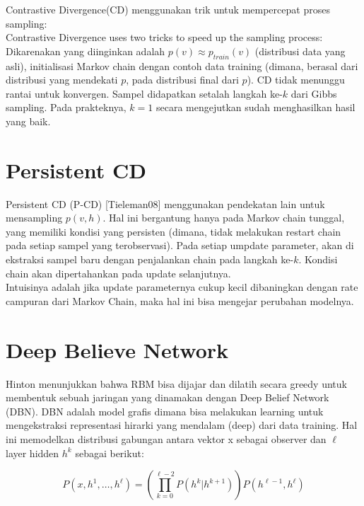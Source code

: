 Contrastive Divergence(CD) menggunakan trik untuk mempercepat proses sampling: \\


Contrastive Divergence uses two tricks to speed up the sampling process:
Dikarenakan yang diinginkan adalah $p(v) \approx p_{train}(v)$ (distribusi data yang asli), initialisasi  Markov chain dengan contoh data training (dimana, berasal dari distribusi yang mendekati $p$, pada distribusi final dari $p$). CD tidak menunggu rantai untuk konvergen. Sampel didapatkan setalah langkah ke-$k$ dari Gibbs sampling. Pada prakteknya, $k=1$ secara mengejutkan sudah menghasilkan hasil yang baik.\\

\section{Persistent CD}

Persistent CD (P-CD) [Tieleman08] menggunakan pendekatan lain untuk mensampling $p(v,h)$. Hal ini bergantung hanya pada Markov chain tunggal, yang memiliki kondisi yang persisten (dimana, tidak melakukan restart chain pada setiap sampel yang terobservasi). Pada setiap umpdate parameter, akan di ekstraksi sampel baru dengan penjalankan chain pada langkah ke-$k$. Kondisi chain akan dipertahankan pada update selanjutnya.\\
Intuisinya adalah jika update parameternya cukup kecil dibaningkan dengan rate campuran dari Markov Chain, maka hal ini bisa mengejar perubahan modelnya.



\section{Deep Believe Network}

Hinton menunjukkan bahwa RBM bisa dijajar dan dilatih secara greedy untuk membentuk sebuah jaringan yang dinamakan dengan Deep Belief Network (DBN). DBN adalah model grafis dimana bisa melakukan learning untuk mengekstraksi representasi hirarki yang mendalam (deep) dari data training. Hal ini memodelkan distribusi gabungan antara vektor x sebagai observer dan $\ell$ layer hidden $h^k$ sebagai berikut:

\begin{equation}
P(x, h^1, \ldots, h^{\ell}) = \left(\prod_{k=0}^{\ell-2} P(h^k|h^{k+1})\right) P(h^{\ell-1},h^{\ell})
\end{equation}

